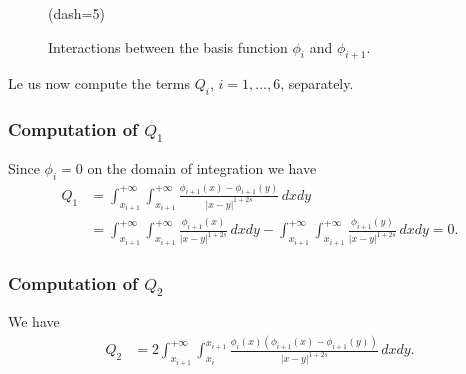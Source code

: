 {\begin{figure}[h]
\figdrawline[33,30]
\figdrawline[31,45]
\figdrawline[38,35]
\figdrawline[40,37]
\figdrawline[33,39]
\figdrawline[31,38]
\figdrawline[30,37]
\figdrawline[43,35]
\figset(dash=5)
\figdrawline[47,48]
\figdrawend

\centerline{\box\figBoxA}
\caption{Interactions between the basis function $\phi_i$ and $\phi_{i+1}$.}\label{upp_dia}
\end{figure}


Le us now compute the terms $Q_i$, $i=1,\ldots,6$, separately. 
\subsubsection*{Computation of $Q_1$}
Since $\phi_i = 0$ on the domain of integration we have
\begin{align*}
	Q_1 &= \int_{x_{i+1}}^{+\infty}\int_{x_{i+1}}^{+\infty} \frac{\phi_{i+1}(x)-\phi_{i+1}(y)}{|x-y|^{1+2s}}\,dxdy 
	\\
	&= \int_{x_{i+1}}^{+\infty}\int_{x_{i+1}}^{+\infty} \frac{\phi_{i+1}(x)}{|x-y|^{1+2s}}\,dxdy - \int_{x_{i+1}}^{+\infty}\int_{x_{i+1}}^{+\infty} \frac{\phi_{i+1}(y)}{|x-y|^{1+2s}}\,dxdy = 0.
\end{align*}

\subsubsection*{Computation of $Q_2$}
We have
\begin{align*}
	Q_2 &= 2\int_{x_{i+1}}^{+\infty}\int_{x_i}^{x_{i+1}} \frac{\phi_i(x)(\phi_{i+1}(x)-\phi_{i+1}(y))}{|x-y|^{1+2s}}\,dxdy. 
\end{align*}

}
